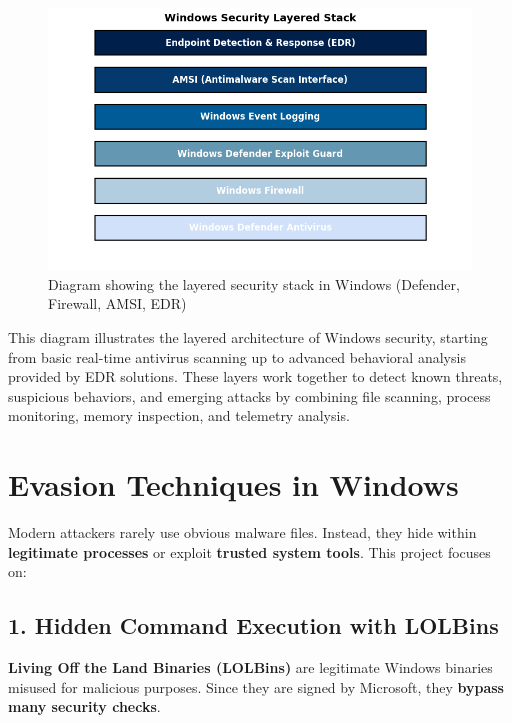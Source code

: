 \begin{figure}[H]
    \centering
    \includegraphics[width=\textwidth]{Pictures/windowssecuritylayer.png}
    \caption{Diagram showing the layered security stack in Windows (Defender, Firewall, AMSI, EDR)}
    \label{fig:windowssecuritylayer}
\end{figure}

This diagram illustrates the layered architecture of Windows security, starting from basic real-time antivirus scanning up to advanced behavioral analysis provided by EDR solutions. These layers work together to detect known threats, suspicious behaviors, and emerging attacks by combining file scanning, process monitoring, memory inspection, and telemetry analysis.

\section{Evasion Techniques in Windows}

Modern attackers rarely use obvious malware files. Instead, they hide within \textbf{legitimate processes} or exploit \textbf{trusted system tools}. This project focuses on:

\subsection{1. Hidden Command Execution with LOLBins}

\textbf{Living Off the Land Binaries (LOLBins)} are legitimate Windows binaries misused for malicious purposes. Since they are signed by Microsoft, they \textbf{bypass many security checks}.

